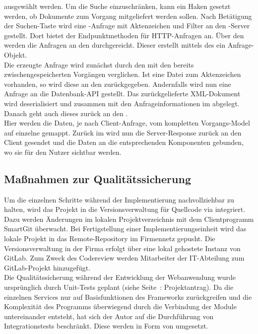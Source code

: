 ausgewählt werden. Um die Suche einzuschränken, kann ein Haken gesetzt werden, ob Dokumente zum Vorgang mitgeliefert werden sollen.
Nach Betätigung der Suchen-Taste wird eine -Anfrage mit Aktenzeichen und Filter an den 
-Server gestellt. Dort bietet der  Endpunktmethoden für \acs{HTTP}-Anfragen an.
Über den  werden die Anfragen an den  durchgereicht.
Dieser erstellt mittels des  ein Anfrage-Objekt.\\
Die erzeugte Anfrage wird zunächst durch den  mit den bereits zwischengespeicherten
Vorgängen verglichen. Ist eine Datei zum Aktenzeichen vorhanden, so wird diese an den  
zurückgegeben. Andernfalls wird nun eine Anfrage an die Datenbank-API gestellt.
Das zurückgelieferte XML-Dokument wird deserialisiert und zusammen mit den Anfrageinformationen im  abgelegt.
Danach geht auch dieses zurück an den .\\
Hier werden die Daten, je nach Client-Anfrage, vom kompletten Vorgangs-Model auf einzelne  gemappt.
Zurück im  wird nun die Server-Response zurück an den Client gesendet und die Daten
an die entsprechenden Komponenten gebunden, wo sie für den Nutzer sichtbar werden.

\subsection{Maßnahmen zur Qualitätssicherung}
\label{sec:Qualitaetssicherung}
Um die einzelnen Schritte während der Implementierung nachvollziehbar zu halten,
wird das Projekt in die Versionsverwaltung für Quellcode via  integriert.
Dazu werden Änderungen im lokalen Projektverzeichnis mit dem Clientprogramm SmartGit überwacht.
Bei Fertigstellung einer Implementierungseinheit wird das lokale Projekt in das 
Remote-Repository im Firmennetz gepusht. Die Versionsverwaltung in der Firma erfolgt über eine lokal gehostete Instanz
von GitLab. Zum Zweck des Codereview werden Mitarbeiter der IT-Abteilung zum GitLab-Projekt hinzugefügt.\\
Die Qualitätssicherung während der Entwicklung der Webanwendung wurde ursprünglich durch Unit-Tests geplant
(siehe Seite~\pageref{Projektantrag}: Projektantrag).
Da die einzelnen Services nur auf Basisfunktionen des Frameworks zurückgreifen und die Komplexität des Programms 
überwiegend durch die Verbindung der Module untereinander entsteht, hat sich der Autor auf die Durchführung von
Integrationstests beschränkt. Diese werden in Form von  umgesetzt.

